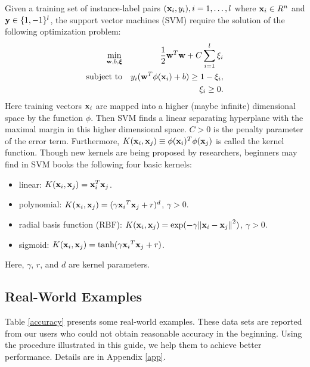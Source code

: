 \documentclass[12pt]{article}
\def\bw{{\bf w}}
\def\bx{{\bf x}}
\def\by{{\bf y}}
\newcommand{\bxi}{{\boldsymbol{\xi}}}
\begin{document}
Given a training set of
instance-label pairs  $(\bx_i,y_i), i = 1, \ldots, l$
where $\bx_i \in R^n$ and $\by \in
\{1, -1 \}^l$,
the support vector machines (SVM)
\cite{BB92a,CC95a} require
the solution of the following optimization
problem:
 \begin{eqnarray}
\min_{\bw,b,\bxi} && \frac{1}{2}\bw^T \bw + C \sum_{i=1}^l \xi_i
\nonumber \\
\mbox{subject to}&& y_i(\bw^T \phi(\bx_i) + b) \geq 1 - \xi_i,\label{svml1}\\
&& \xi_i \geq 0. \nonumber
\end{eqnarray}
Here training vectors $\bx_i$ are mapped into a
higher (maybe infinite) dimensional space
by the function $\phi$.
Then SVM finds a linear separating hyperplane
with the maximal margin in this
higher dimensional space.
$C>0$ is the penalty parameter of
the error term. Furthermore, $K(\bx_i, \bx_j) \equiv 
\phi(\bx_i)^T\phi(\bx_j)$ is called the kernel function.
Though new kernels are being proposed by researchers, 
beginners may find in SVM books the following four
basic kernels:
\begin{itemize}
\item linear: $K(\bx_i, \bx_j) = \bx_i ^T \bx_j$.
\item polynomial: $K(\bx_i, \bx_j) = (\gamma {\bx_i}^T \bx_j + r)^d$, $\gamma > 0$.
\item radial basis function (RBF): $K(\bx_i, \bx_j) = 
\exp(-\gamma{\|\bx_i-\bx_j\|}^2)$, $\gamma > 0$.
\item sigmoid: $K(\bx_i, \bx_j) = \tanh(\gamma {\bx_i}^T \bx_j + r)$.
\end{itemize}
Here, $\gamma$, $r$, and $d$ are kernel parameters.

\subsection{Real-World Examples}

Table \ref{accuracy} presents some real-world examples. These data 
sets are reported from our users who could not obtain reasonable 
accuracy in the beginning. Using the procedure illustrated in this 
guide, we help them to achieve better performance. Details are in 
Appendix \ref{app}. 
\end{document}
